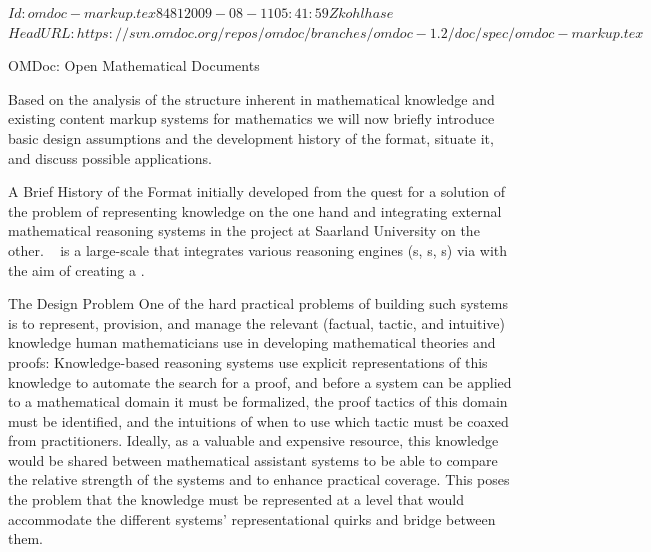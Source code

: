 \svnInfo $Id: omdoc-markup.tex 8481 2009-08-11 05:41:59Z kohlhase $
\svnKeyword $HeadURL: https://svn.omdoc.org/repos/omdoc/branches/omdoc-1.2/doc/spec/omdoc-markup.tex $

\begin{tchapter}[id=omdoc-markup,short=Open Mathematical Documents]{OMDoc: Open Mathematical Documents}

  Based on the analysis of the structure inherent in mathematical knowledge and existing
  content markup systems for mathematics we will now briefly introduce basic design
  assumptions and the development history of the {\omdoc} format, situate it, and discuss
  possible applications.

  \begin{tsection}[id=omdoc-history]{A Brief History of the {\omdoc} Format}
    {\omdoc} initially developed from the quest for a solution of the problem of
    representing knowledge on the one hand and integrating external mathematical reasoning
    systems in the {\OMEGA} project at Saarland University on the
    other. {\OMEGA}~\cite{OMEGA02} is a large-scale
    {} that integrates various reasoning engines
    ({s}, {s},
    {s}) via
    {} with the aim of creating a
    {}.

    \begin{tsubsection}{The Design Problem}
      One of the hard practical problems of building such systems is to represent,
      provision, and manage the relevant (factual, tactic, and
      intuitive) knowledge human mathematicians use in
      developing mathematical theories and proofs: Knowledge-based reasoning systems use
      explicit representations of this knowledge to automate the search for a proof, and
      before a system can be applied to a mathematical domain it must be formalized, the
      proof tactics of this domain must be identified, and the intuitions of when to use
      which tactic must be coaxed from practitioners. Ideally, as a valuable and expensive
      resource, this knowledge would be shared between mathematical assistant systems to
      be able to compare the relative strength of the systems and to enhance practical
      coverage. This poses the problem that the knowledge must be represented at a level
      that would accommodate the different systems' representational quirks and bridge
      between them.


\end{tsubsection}
\end{tsection}
\end{tchapter}
